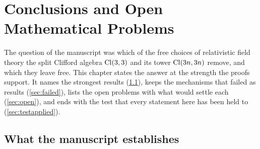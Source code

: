 \chapter{Conclusions and Open Mathematical Problems}
\label{ch:ch16_conclusions}

The question of the manuscript was which of the free choices of relativistic field theory the split Clifford algebra $\mathrm{Cl}(3,3)$ and its
tower $\mathrm{Cl}(3n,3n)$ remove, and which they leave free. This chapter states the answer at the strength the proofs support. It names the
strongest results (\cref{sec:contrib}), keeps the mechanisms that failed as results (\cref{sec:failed}), lists the open problems with what
would settle each (\cref{sec:open}), and ends with the test that every statement here has been held to (\cref{sec:testapplied}).

\section{What the manuscript establishes}
\label{sec:contrib}

